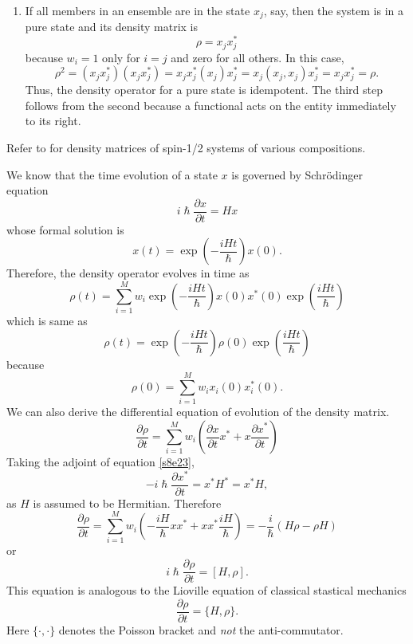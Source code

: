 \documentclass{article}
\numberwithin{equation}{section}
\theoremstyle{plain}
\numberwithin{thm}{section}
\theoremstyle{plain}
\numberwithin{prop}{section}
\theoremstyle{definition}
\numberwithin{defn}{section}
\theoremstyle{remark}
\begin{document}
\begin{enumerate}
\item If all members in an ensemble are in the state $x_j$, say, then the 
system is in a pure state and its density matrix is
\begin{equation}\label{s8e21}
\rho = x_j x_j^\ast
\end{equation}
because $w_i=1$ only for $i=j$ and zero for all others. In this case,
\begin{equation}\label{s8e22}
\rho^2 = (x_j x_j^\ast)(x_j x_j^\ast) = x_j x_j^\ast(x_j) x_j^\ast = 
x_j (x_j, x_j) x_j^\ast = x_j x_j^\ast = \rho.
\end{equation}
Thus, the density operator for a pure state is idempotent. The third step
follows from the second because a functional acts on the entity immediately to
its right.
\end{enumerate}

Refer to \cite[pages 179-180]{sakurai2011modern} for density matrices of 
spin-1/2 systems of various compositions.

We know that the time evolution of a state $x$ is governed by Schr\"{o}dinger
equation
\begin{equation}\label{s8e23}
i\hslash\frac{\partial x}{\partial t} = Hx
\end{equation}
whose formal solution is
\begin{equation}\label{s8e24}
x(t) = \exp\left(-\frac{iHt}{\hslash}\right)x(0).
\end{equation}
Therefore, the density operator evolves in time as
\[
\rho(t) = \sum_{i=1}^Mw_i \exp\left(-\frac{iHt}{\hslash}\right)x(0)x^\ast(0)
\exp\left(\frac{iHt}{\hslash}\right)
\]
which is same as
\begin{equation}\label{s8e25}
\rho(t) = \exp\left(-\frac{iHt}{\hslash}\right)\rho(0)
\exp\left(\frac{iHt}{\hslash}\right)
\end{equation}
because
\[
\rho(0) = \sum_{i=1}^M w_i x_i(0)x_i^\ast(0).
\]
We can also derive the differential equation of evolution of the density matrix.
\[
\frac{\partial\rho}{\partial t} = \sum_{i=1}^M w_i
\left(\frac{\partial x}{\partial t}x^\ast + x\frac{\partial x^\ast}{\partial t}\right)
\]
Taking the adjoint of equation \eqref{s8e23},
\[
-i\hslash\frac{\partial x^\ast}{\partial t} = x^\ast H^\ast = x^\ast H,
\]
as $H$ is assumed to be Hermitian. Therefore
\[
\frac{\partial\rho}{\partial t} = \sum_{i=1}^M w_i\left(
-\frac{iH}{\hslash}xx^\ast + xx^\ast\frac{iH}{\hslash}\right)
= -\frac{i}{\hslash}(H\rho - \rho H)
\]
or
\begin{equation}\label{s8e26}
i\hslash\frac{\partial\rho}{\partial t} = [H, \rho].
\end{equation}
This equation is analogous to the Lioville equation of classical stastical 
mechanics
\begin{equation}\label{s8e27}
\frac{\partial\rho}{\partial t} = \{H, \rho\}.
\end{equation}
Here $\{\cdot, \cdot\}$ denotes the Poisson bracket and \emph{not} the 
anti-commutator.
\end{document}
